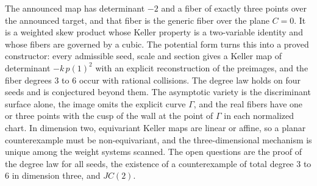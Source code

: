 \documentclass[11pt]{article}
\theoremstyle{definition}
\theoremstyle{remark}
\begin{document}
The announced map has determinant $-2$ and a fiber of exactly three points over the announced target, and that fiber is the generic fiber over the plane $C = 0$. It is a weighted skew product whose Keller property is a two-variable identity and whose fibers are governed by a cubic. The potential form turns this into a proved constructor: every admissible seed, scale and section gives a Keller map of determinant $-k\,p(1)^2$ with an explicit reconstruction of the preimages, and the fiber degrees $3$ to $6$ occur with rational collisions. The degree law holds on four seeds and is conjectured beyond them. The asymptotic variety is the discriminant surface alone, the image omits the explicit curve $\Gamma$, and the real fibers have one or three points with the cusp of the wall at the point of $\Gamma$ in each normalized chart. In dimension two, equivariant Keller maps are linear or affine, so a planar counterexample must be non-equivariant, and the three-dimensional mechanism is unique among the weight systems scanned. The open questions are the proof of the degree law for all seeds, the existence of a counterexample of total degree $3$ to $6$ in dimension three, and $JC(2)$.
\end{document}
